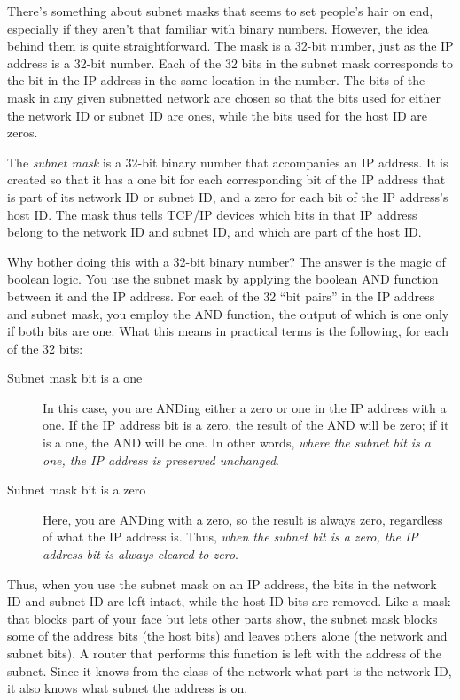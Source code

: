 There's something about subnet masks that seems to set people's hair on end, especially if they aren't that familiar with binary numbers.
However, the idea behind them is quite straightforward.
The mask is a 32-bit number, just as the IP address is a 32-bit number.
Each of the 32 bits in the subnet mask corresponds to the bit in the IP address in the same location in the number.
The bits of the mask in any given subnetted network are chosen so that the bits used for either the network ID or subnet ID are ones,
while the bits used for the host ID are zeros.


\begin{keyconcept}
The \emph{subnet mask} is a 32-bit binary number that accompanies an IP address.
It is created so that it has a one bit for each corresponding bit of the IP address that is part of its
network ID or subnet ID, and a zero for each bit of the IP address's
host ID. The mask thus tells TCP/IP devices which bits in that IP
address belong to the network ID and subnet ID, and which are part of the host ID.
\end{keyconcept}

Why bother doing this with a 32-bit binary number? The answer is the
magic of boolean logic. You use the subnet mask by applying the boolean
AND function between it and the IP address. For each of the 32 ``bit
pairs'' in the IP address and subnet mask, you employ the AND function,
the output of which is one only if both bits are one. What this means in
practical terms is the following, for each of the 32 bits:

\begin{description}
   \item[Subnet mask bit is a one]
      In this case, you are ANDing either a zero or one in the IP address with a one.
      If the IP address bit is a zero, the result of the AND will be zero; if it is a one, the AND will be one.
      In other words, \emph{where the subnet bit is a one, the IP address is preserved unchanged}.

   \item[Subnet mask bit is a zero]
      Here, you are ANDing with a zero, so the result is always zero, regardless of what the IP address is.
      Thus, \emph{when the subnet bit is a zero, the IP address bit is always cleared to zero}.
\end{description}

Thus, when you use the subnet mask on an IP address, the bits in the
network ID and subnet ID are left intact, while the host ID bits are
removed. Like a mask that blocks part of your face but lets other parts
show, the subnet mask blocks some of the address bits (the host bits)
and leaves others alone (the network and subnet bits). A router that
performs this function is left with the address of the subnet. Since it
knows from the class of the network what part is the network ID, it also
knows what subnet the address is on.



